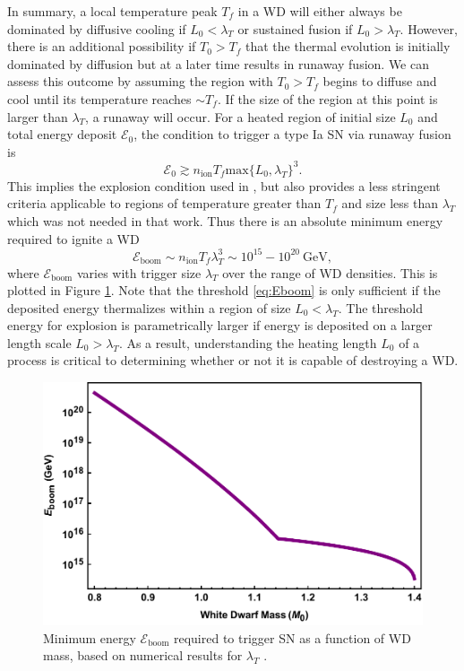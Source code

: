 \documentclass[twocolumn,showpacs,preprintnumbers,amsmath,amssymb,prd]{revtex4}
\newcommand{\Ez}{\mathcal{E}_0}
\newcommand{\Eboom}{\mathcal{E}_\text{boom}}
\newcommand{\GeV}{\text{GeV}}
\begin{document}
In summary, a local temperature peak $T_f$ in a WD will either always be dominated by diffusive cooling if $L_0 < \lambda_T$ or sustained fusion if $L_0 > \lambda_T$.  
However, there is an additional possibility if $T_0 > T_f$ that the thermal evolution is initially dominated by diffusion but at a later time results in runaway fusion. 
We can assess this outcome by assuming the region with $T_0 > T_f$ begins to diffuse and cool until its temperature reaches $\sim T_f$.
If the size of the region at this point is larger than $\lambda_T$, a runaway will occur.  
For a heated region of initial size $L_0$ and total energy deposit $\Ez$, the condition to trigger a type Ia SN via runaway fusion is
\begin{equation}
\label{eq:boom}
  \Ez \gtrsim n_\text{ion} T_f \text{max}\{L_0, \lambda_T\}^3.
\end{equation}
This implies the explosion condition used in \cite{Graham:2015apa}, but also provides a less stringent criteria applicable to regions of temperature greater than $T_f$ and size less than $\lambda_T$ which was not needed in that work.  
Thus there is an absolute minimum energy required to ignite a WD
\begin{equation}
\label{eq:Eboom}
\mathcal{E}_{\text{boom}} \sim n_\text{ion} T_f \lambda_T^3 \sim 10^{15} - 10^{20} ~\GeV,
\end{equation}
where $\mathcal{E}_{\text{boom}} $ varies with trigger size $\lambda_T$ over the range of WD densities.
This is plotted in Figure \ref{fig:Eboom}.
Note that the threshold \eqref{eq:Eboom} is only sufficient if the deposited energy thermalizes within a region of size $L_0 < \lambda_T$.
The threshold energy for explosion is parametrically larger if energy is deposited on a larger length scale $L_0 > \lambda_T$.
As a result, understanding the heating length $L_0$ of a process is critical to determining whether or not it is capable of destroying a WD. 
\begin{figure}
\includegraphics[scale=.45]{Eboom.pdf}
\caption{Minimum energy $\Eboom$ required to trigger SN as a function of WD mass, based on numerical results for $\lambda_T$ \cite{Woosley}.}
\label{fig:Eboom}
\end{figure}
\end{document}
